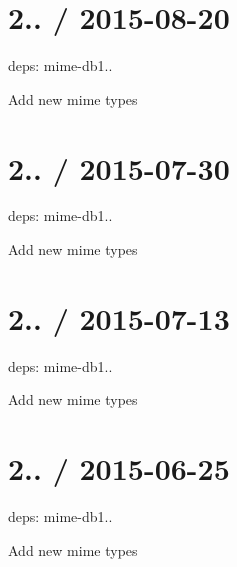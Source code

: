 \section*{2.. / 2015-\/08-\/20 }


\begin{DoxyItemize}
\item deps\+: mime-\/db1..
\begin{DoxyItemize}
\item Add new mime types
\end{DoxyItemize}
\end{DoxyItemize}

\section*{2.. / 2015-\/07-\/30 }


\begin{DoxyItemize}
\item deps\+: mime-\/db1..
\begin{DoxyItemize}
\item Add new mime types
\end{DoxyItemize}
\end{DoxyItemize}

\section*{2.. / 2015-\/07-\/13 }


\begin{DoxyItemize}
\item deps\+: mime-\/db1..
\begin{DoxyItemize}
\item Add new mime types
\end{DoxyItemize}
\end{DoxyItemize}

\section*{2.. / 2015-\/06-\/25 }


\begin{DoxyItemize}
\item deps\+: mime-\/db1..
\begin{DoxyItemize}
\item Add new mime types
\end{DoxyItemize}
\end{DoxyItemize}

